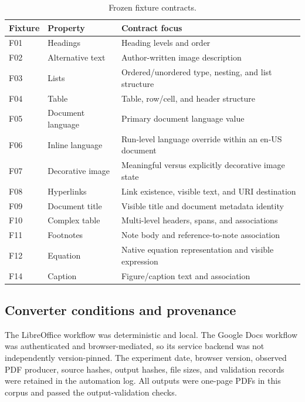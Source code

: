 \begin{table}[t]
\centering\small
\caption{Frozen fixture contracts.}
\label{tab:fixtures}
\begin{tabular}{p{}p{}p{}}
\hline
Fixture & Property & Contract focus \\
\hline
F01 & Headings & Heading levels and order \\
F02 & Alternative text & Author-written image description \\
F03 & Lists & Ordered/unordered type, nesting, and list structure \\
F04 & Table & Table, row/cell, and header structure \\
F05 & Document language & Primary document language value \\
F06 & Inline language & Run-level language override within an en-US document \\
F07 & Decorative image & Meaningful versus explicitly decorative image state \\
F08 & Hyperlinks & Link existence, visible text, and URI destination \\
F09 & Document title & Visible title and document metadata identity \\
F10 & Complex table & Multi-level headers, spans, and associations \\
F11 & Footnotes & Note body and reference-to-note association \\
F12 & Equation & Native equation representation and visible expression \\
F14 & Caption & Figure/caption text and association \\
\hline
\end{tabular}
\end{table}

\subsection{Converter conditions and provenance}

The LibreOffice workflow was deterministic and local. The Google Docs workflow was authenticated and browser-mediated, so its service backend was not independently version-pinned. The experiment date, browser version, observed PDF producer, source hashes, output hashes, file sizes, and validation records were retained in the automation log. All outputs were one-page PDFs in this corpus and passed the output-validation checks.

